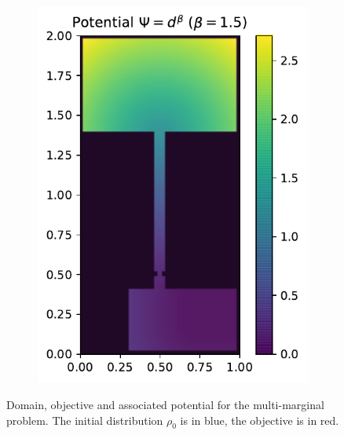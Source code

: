 \documentclass[../report.tex]{subfiles}
\begin{document}
\begin{figure}
\begin{subfigure}[t]{.48\linewidth}
	\includegraphics[width=\linewidth]{../project/images/multimarg_room2/room2_potential.pdf}
	\end{subfigure}
	\caption{Domain, objective and associated potential for the multi-marginal problem. The initial distribution $\rho_0$ is in blue, the objective is in red.}\label{fig:NMarg1DomainPot}
\end{figure}
\end{document}
